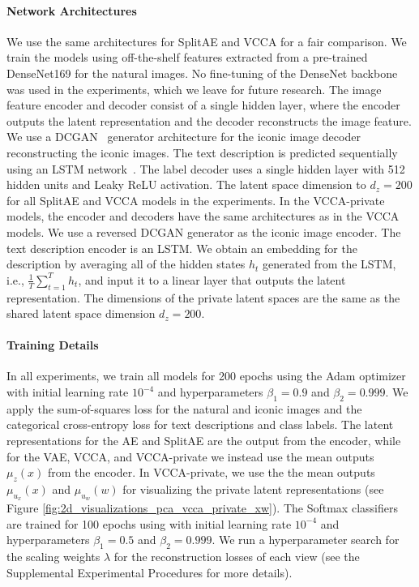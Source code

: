 \paragraph{Network Architectures} We use the same architectures for SplitAE and VCCA for a fair comparison. We train the models using off-the-shelf features extracted from a pre-trained DenseNet169 for the natural images. No fine-tuning of the DenseNet backbone was used in the experiments, which we leave for future research. The image feature encoder and decoder consist of a single hidden layer, where the encoder outputs the latent representation and the decoder reconstructs the image feature. We use a DCGAN~\cite{radford2015unsupervised} generator architecture for the iconic image decoder reconstructing the iconic images. The text description is predicted sequentially using an LSTM network~\cite{hochreiter1997long}. The label decoder uses a single hidden layer with 512 hidden units and Leaky ReLU activation. 
The latent space dimension to $d_{z} = 200$ for all SplitAE and VCCA models in the experiments. In the VCCA-private models, the encoder and decoders have the same architectures as in the VCCA models. We use a reversed DCGAN generator as the iconic image encoder. The text description encoder is an LSTM. We obtain an embedding for the description by averaging all of the hidden states $h_t$ generated from the LSTM, i.e., $\frac{1}{T} \sum_{t=1}^{T} h_t$, and input it to a linear layer that outputs the latent representation. The dimensions of the private latent spaces are the same as the shared latent space dimension $d_{z} = 200$. 

\paragraph{Training Details} In all experiments, we train all models for 200 epochs using the Adam optimizer~\cite{kingma2015adam} with initial learning rate $10^{-4}$ and hyperparameters $\beta_1 = 0.9$ and $\beta_2 = 0.999$. We apply the sum-of-squares loss for the natural and iconic images and the categorical cross-entropy loss for text descriptions and class labels. The latent representations for the AE and SplitAE are the output from the encoder, while for the VAE, VCCA, and VCCA-private we instead use the mean outputs $\mu_{z}(x)$ from the encoder. In VCCA-private, we use the the mean outputs $\mu_{u_{x}}(x)$ and $\mu_{u_{w}}(w)$ for visualizing the private latent representations (see Figure \ref{fig:2d_visualizations_pca_vcca_private_xw}). The Softmax classifiers are trained for 100 epochs using with initial learning rate $10^{-4}$ and hyperparameters $\beta_1 = 0.5$ and $\beta_2 = 0.999$. We run a hyperparameter search for the scaling weights $\lambda$ for the reconstruction losses of each view (see the Supplemental Experimental Procedures
for more details). 


